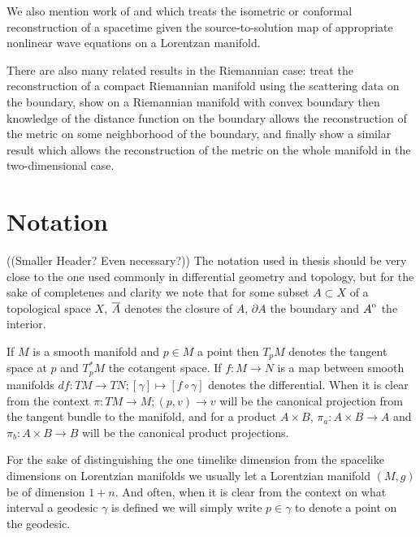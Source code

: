 We also mention work of \citet{wang2019inverse} and \citet{lassas2018inverse} which treats the isometric or conformal reconstruction of a spacetime given the source-to-solution map of appropriate nonlinear wave equations on a Lorentzan manifold.

There are also many related results in the Riemannian case: \citet{lassas2017reconstruction} treat the reconstruction of a compact Riemannian manifold using the scattering data on the boundary, \citet{stefanov2017local} show on a Riemannian manifold with convex boundary then knowledge of the distance function on the boundary allows the reconstruction of the metric on some neighborhood of the boundary, and finally \citet{pestov2005two} show a similar result which allows the reconstruction of the metric on the whole manifold in the two-dimensional case.

\section{Notation}((Smaller Header? Even necessary?))
The notation used in thesis should be very close to the one used commonly in differential geometry and topology, but for the sake of completenes and clarity we note that for some subset $A\subset X$ of a topological space $X$, ${\overline{A}}$ denotes the closure of $A$, $\partial A$ the boundary and ${\kern0ptA}^{\mathrm{o}}$ the interior. 

If $M$ is a smooth manifold and $p\in M$ a point then $T_pM$ denotes the tangent space at $p$ and $T^*_pM$ the cotangent space. If $f:M\to N$ is a map between smooth manifolds $df:TM\to TN; [\gamma]\mapsto [f\circ\gamma]$ denotes the differential. When it is clear from the context $\pi:TM\to M; (p,v)\to v$ will be the canonical projection from the tangent bundle to the manifold, and for a product $A\times B$, $\pi_a:A\times B\to A$ and $\pi_b:A\times B\to B$ will be the canonical product projections.

For the sake of distinguishing the one timelike dimension from the spacelike dimensions on Lorentzian manifolds we usually let a Lorentzian manifold $(M,g)$ be of dimension $1+n$. And often, when it is clear from the context on what interval a geodesic $\gamma$ is defined we will simply write $p\in \gamma$ to denote a point on the geodesic.